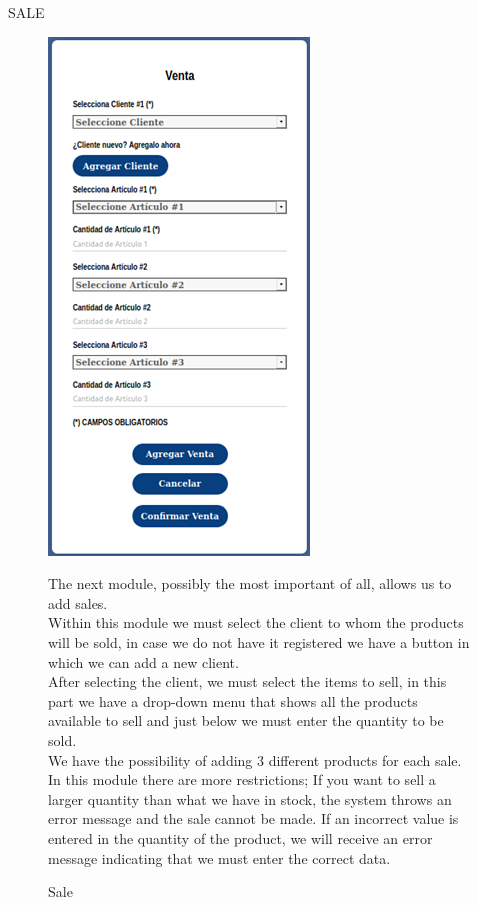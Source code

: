 \documentclass{article}
\begin{document}
\begin{center}
SALE
\end{center}
\begin{figure}[ht]
\begin{minipage}[t]{0.5\linewidth}
\caption {Sale}
\centering
\includegraphics[scale=1]{fig6}
\end{minipage}
\begin{minipage}[t]{0.5\linewidth}
The next module, possibly the most important of all, allows us to add sales.\\

Within this module we must select the client to whom the products will be sold, in case we do not have it registered we have a button in which we can add a new client.\\

After selecting the client, we must select the items to sell, in this part we have a drop-down menu that shows all the products available to sell and just below we must enter the quantity to be sold.\\

We have the possibility of adding 3 different products for each sale.\\

In this module there are more restrictions; If you want to sell a larger quantity than what we have in stock, the system throws an error message and the sale cannot be made. If an incorrect value is entered in the quantity of the product, we will receive an error message indicating that we must enter the correct data.\\


\end{minipage}
\end{figure}
\end{document}
